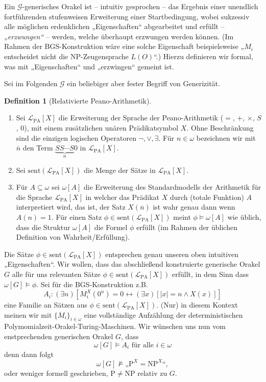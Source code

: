 \documentclass[nofonts]{uebung}
\theoremstyle{definition}
\newtheorem{definition}[theorem]{Definition}
\def\P{\ensuremath{\mathrm{P}}}
\def\NP{\ensuremath{\mathrm{NP}}}
\begin{document}
Ein $\mathcal G$-generisches Orakel ist -- intuitiv gesprochen -- das Ergebnis einer unendlich fortführenden stufenweisen Erweiterung einer Startbedingung, wobei sukzessiv alle möglichen erdenklichen „Eigenschaften“ abgearbeitet und erfüllt -- \emph{„erzwungen“} -- werden, welche überhaupt erzwungen werden können. (Im Rahmen der BGS-Konstruktion wäre eine solche Eigenschaft beispielsweise „$M_i$ entscheidet nicht die NP-Zeugensprache $L(O)$“.)
Hierzu definieren wir formal, was mit „Eigenschaften“ und „erzwingen“ gemeint ist.

Sei im Folgenden $\mathcal G$ ein beliebiger aber fester Begriff von Generizität.
\begin{definition}[Relativierte Peano-Arithmetik]
    \begin{enumerate}
        \item Sei $\mathcal L_{\mathrm{PA}}[X]$ die Erweiterung der Sprache der Peano-Arithmetik ($=$, $+$, $\times$, $S$, $0$), mit einem zusätzlichen unären Prädikatsymbol $X$.
Ohne Beschränkung sind die einzigen logischen Operatoren $\neg, \lor, \exists$.
Für $n\in\omega$ bezeichnen wir mit $\overline{n}$ den Term $\underbrace{SS\cdots S}_{n}0$ in $\mathcal L_{\mathrm{PA}}[X]$. 
        \item Sei $\mathrm{sent}(\mathcal L_{\mathrm{PA}}[X])$ die Menge der Sätze in $\mathcal L_{\mathrm{PA}}[X]$.
        \item Für $A\subseteq\omega$ sei $\omega[A]$ die Erweiterung des Standardmodells der Arithmetik für die Sprache $\mathcal L_{\mathrm{PA}}[X]$ in welcher das Prädikat $X$ durch (totale Funktion) $A$ interpretiert wird, das ist, der Satz $X(\overline{n})$ ist wahr genau dann wenn $A(n)=1$.
            Für einen Satz $\phi\in\mathrm{sent}(\mathcal L_{\mathrm{PA}}[X])$ meint $\phi\vDash \omega[A]$ wie üblich, dass die Struktur $\omega[A]$ die Formel $\phi$ erfüllt (im Rahmen der üblichen Definition von Wahrheit/Erfüllung).
    \end{enumerate}
\end{definition}
Die Sätze $\phi\in\mathrm{sent}(\mathcal L_{\mathrm{PA}}[X])$ entsprechen genau unseren oben intuitiven „Eigenschaften“.
Wir wollen, dass das abschließend konstruierte generische Orakel $G$ alle für uns relevanten Sätze $\phi\in\mathrm{sent}(\mathcal L_{\mathrm{PA}}[X])$ erfüllt, in dem Sinn dass $\omega[G]\vDash \phi$.
Sei für die BGS-Konstruktion z.B.
\[ A_i : (\exists n)[M^X_i(0^n)=0 \leftrightarrow (\exists x)[|x|=n\land X(x)]] \]
eine Familie an Sätzen aus $\phi\in\mathrm{sent}(\mathcal L_{\mathrm{PA}}[X])$. (Nur) in diesem Kontext meinen wir mit $\{M_i\}_{i\in\omega}$ eine vollständige Aufzählung der deterministischen Polymomialzeit-Orakel-Turing-Maschinen.
Wir wünschen uns nun vom enstprechenden generischen Orakel $G$, dass 
\[ \omega[G] \vDash A_i \text{ für alle $i\in\omega$} \]
denn dann folgt
\[ \omega[G] \not\vDash „\P^X=\NP^X“, \]
oder weniger formell geschrieben, $\P\neq\NP$ relativ zu $G$.
\end{document}
